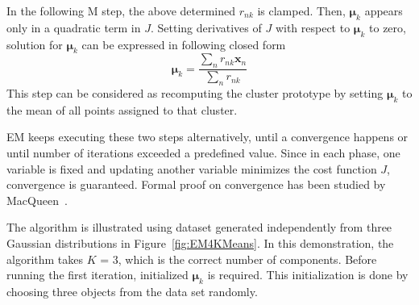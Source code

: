 In the following M step, the above determined \(r_{nk}\) is clamped. Then, \(\boldsymbol{\mu}_k\) appears only in a quadratic term in \(J\). Setting derivatives of \(J\) with respect to \(\boldsymbol{\mu}_k\) to zero, solution for \(\boldsymbol{\mu}_k\) can be expressed in following closed form
\begin{equation}
	\label{eq:muupdate}
	\boldsymbol{\mu}_{k} = \frac{\sum_n r_{nk}\mathbf{x}_n}{\sum_n r_{nk}}
\end{equation}
This step can be considered as recomputing the cluster prototype by setting \(\boldsymbol{\mu}_k\) to the mean of all points assigned to that cluster. 

EM keeps executing these two steps alternatively, until a convergence happens or until number of iterations exceeded a predefined value. Since in each phase, one variable is fixed and updating another variable minimizes the cost function \(J\), convergence is guaranteed. Formal proof on convergence has been studied by MacQueen~\cite{macqueen1967some}.

The algorithm is illustrated using dataset generated independently from three Gaussian distributions in Figure~\ref{fig:EM4KMeans}. In this demonstration, the algorithm takes \(K\) = 3, which is the correct number of components. Before running the first iteration, initialized \(\boldsymbol{\mu}_k\) is required. This initialization is done by choosing three objects from the data set randomly.

